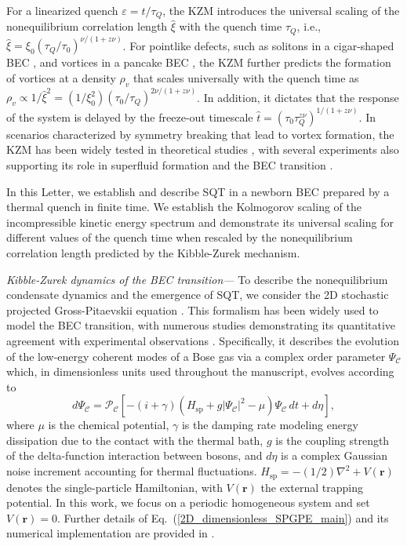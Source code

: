 \documentclass[aps,prl,twocolumn,showpacs,notitlepage,floatfix,superscriptaddress]{revtex4-1}
\begin{document}
For a linearized quench $\varepsilon=t/\tau_Q$, the KZM introduces the universal scaling of the nonequilibrium correlation length $\hat\xi$ with the quench time $\tau_Q$, i.e., $\hat\xi=\xi_0(\tau_Q/\tau_0)^{\nu/(1+z\nu)}$. For pointlike defects, such as solitons in a cigar-shaped BEC \cite{Damski_soliton_2010,Lamporesi13}, and vortices in a pancake BEC \cite{Weiler08,Chomaz15}, the KZM further predicts the formation of vortices at a density $\rho_{v}$ that scales universally with the quench time
as $\rho_v
\propto 1 / \hat{\xi}^2=\left( 1 / \xi_0^2 \right) \left( \tau_0 / \tau_Q \right)^{2 \nu/(1+z\nu)}$.
In addition, it dictates that the response of the system is delayed by the freeze-out timescale $\hat{t}=(\tau_0 \tau_Q^{z\nu})^{1/(1+z\nu)}$. In scenarios characterized by
symmetry breaking that lead to vortex formation, the KZM has been widely tested in theoretical studies \cite{DRP11,Chesler15,Liu2020,Zeng23,Thudiyangal24,Wheeler2025,Kirkby2025}, with several experiments also supporting its role in superfluid formation and the BEC transition \cite{Ruutu1996,Weiler08,Navon15,Shin19,KimShin22}.

In this Letter, we establish and describe SQT in a newborn BEC prepared by a thermal quench in finite time. We establish the Kolmogorov scaling of the incompressible kinetic energy
spectrum and demonstrate its universal scaling for different values of the quench time when rescaled by the nonequilibrium correlation length predicted by the Kibble-Zurek mechanism.

{\it Kibble-Zurek dynamics of the BEC transition---}
To describe the nonequilibrium condensate dynamics and the emergence of SQT, we consider the
2D stochastic projected Gross-Pitaevskii equation \cite{Gardiner2003,blakie2008dynamics,Rooney2012,Rooney2014,Bradley2015,McDonald2020}.
This formalism has been widely used to model the BEC transition, with numerous studies demonstrating its quantitative agreement with experimental observations \cite{Weiler08,Liu2020}.
Specifically, it describes the evolution of the low-energy coherent modes of a Bose gas via a complex order parameter $\Psi_{\mathcal{C}}$ which,
in dimensionless units used throughout the manuscript,
evolves according to
\begin{equation}\label{2D_dimensionless_SPGPE_main}
    d{\Psi_{\mathcal{C}}} = \mathcal{P}_{\mathcal{C}} \left[ -(i + \gamma) \left( H_{\textrm{sp}} + g |\Psi_{\mathcal{C}}|^{2} -\mu\right) \Psi_{\mathcal{C}} \, dt + d \eta \right],
\end{equation}
where $\mu$ is the chemical potential, $\gamma$ is the damping rate modeling energy dissipation due to the contact with the thermal bath, $g$ is the coupling strength of the delta-function interaction between bosons, and $d\eta$ is a complex Gaussian noise increment accounting for thermal fluctuations.
$H_{\textrm{sp}} = - \left( 1 / 2 \right) \nabla^{2} + V(\boldsymbol{r})$ denotes the single-particle Hamiltonian, with $V(\boldsymbol{r})$ the external trapping potential. In this work, we focus on a periodic homogeneous system and set $V(\boldsymbol{r})=0$. Further details of Eq.~(\ref{2D_dimensionless_SPGPE_main}) and its numerical implementation are provided in \cite{SM}.
\end{document}
